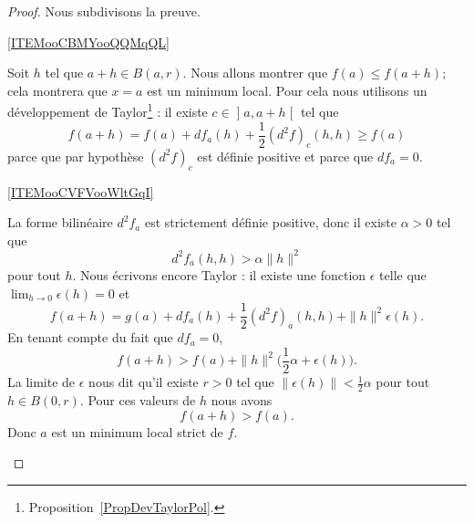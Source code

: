 \begin{proof}
    Nous subdivisons la preuve.

    \begin{subproof}

    \item[\ref{ITEMooCBMYooQQMqQL}]

    Soit \( h\) tel que \( a+h\in B(a,r)\). Nous allons montrer que \( f(a)\leq f(a+h)\); cela montrera que \( x=a\) est un minimum local. Pour cela nous utilisons un développement de Taylor\footnote{Proposition~\ref{PropDevTaylorPol}.} : il existe \( c\in \mathopen] a , a+h \mathclose[\) tel que
        \begin{equation}
            f(a+h)=f(a)+df_a(h)+\frac{ 1 }{2}(d^2f)_c(h,h)\geq f(a)
        \end{equation}
        parce que par hypothèse \( (d^2f)_c\) est définie positive et parce que \( df_a=0\).

    \item[\ref{ITEMooCVFVooWltGqI}]

        La forme bilinéaire \( d^2f_a\) est strictement définie positive, donc il existe \( \alpha>0\) tel que
        \begin{equation}
            d^2f_a(h,h)>\alpha\| h \|^2
        \end{equation}
        pour tout \( h\). Nous écrivons encore Taylor : il existe une fonction \( \epsilon\) telle que \( \lim_{h\to 0} \epsilon(h)=0\) et
        \begin{equation}
            f(a+h)=g(a)+df_a(h)+\frac{ 1 }{2}(d^2f)_a(h,h)+\| h \|^2\epsilon(h).
        \end{equation}
        En tenant compte du fait que \( df_a=0\),
        \begin{equation}
            f(a+h)>f(a)+\| h \|^2\big( \frac{ 1 }{2}\alpha+ \epsilon(h) \big).
        \end{equation}
        La limite de \( \epsilon\) nous dit qu'il existe \( r>0\) tel que \( \| \epsilon(h) \|<\frac{ 1 }{2}\alpha\) pour tout \( h\in B(0,r)\). Pour ces valeurs de \( h\) nous avons
        \begin{equation}
            f(a+h)>f(a).
        \end{equation}
        Donc \( a\) est un minimum local strict de \( f\).


\end{subproof}
\end{proof}
